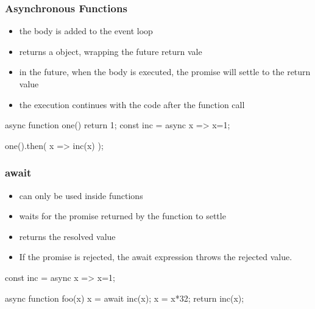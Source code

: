 \begin{frame}[fragile] \frametitle{Asynchronous Functions}
\begin{itemize}
  \item the body is added to the event loop
  \item returns a  object, wrapping the future return vale
  \item in the future, when the body is executed, the promise will settle to the return value
  \item the execution continues with the code after the function call
\end{itemize}
\vspace{5mm}
\begin{CodeBox}{}
async function one() {
  return 1;
}
const inc = async x => x=1;

one().then(
  x => inc(x)
);
\end{CodeBox}
\end{frame}

\begin{frame}[fragile] \frametitle{await}
\begin{itemize}
  \item can only be used inside  functions
  \item waits for the promise returned by the  function to settle
  \item returns the resolved value
  \item If the promise is rejected, the await expression throws the rejected value.
\end{itemize}
\vspace{5mm}
\begin{CodeBox}{}
const inc = async x => x=1;

async function foo(x) {
  x = await inc(x);
  x = x*32;
  return inc(x);
}
\end{CodeBox}
\end{frame}

